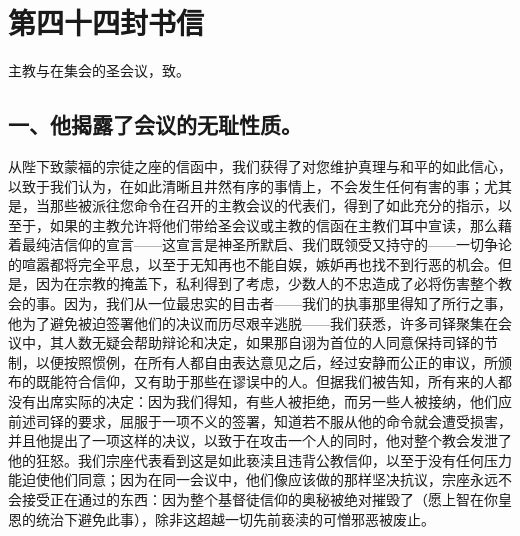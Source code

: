 

\section{第四十四封书信}

主教与在集会的圣会议，致。\par


\subsection{一、他揭露了会议的无耻性质。}

从陛下致蒙福的宗徒之座的信函中，我们获得了对您维护真理与和平的如此信心，以致于我们认为，在如此清晰且井然有序的事情上，不会发生任何有害的事；尤其是，当那些被派往您命令在召开的主教会议的代表们，得到了如此充分的指示，以至于，如果的主教允许将他们带给圣会议或主教的信函在主教们耳中宣读，那么藉着最纯洁信仰的宣言——这宣言是神圣所默启、我们既领受又持守的——一切争论的喧嚣都将完全平息，以至于无知再也不能自娱，嫉妒再也找不到行恶的机会。但是，因为在宗教的掩盖下，私利得到了考虑，少数人的不忠造成了必将伤害整个教会的事。因为，我们从一位最忠实的目击者——我们的执事那里得知了所行之事，他为了避免被迫签署他们的决议而历尽艰辛逃脱——我们获悉，许多司铎聚集在会议中，其人数无疑会帮助辩论和决定，如果那自诩为首位的人同意保持司铎的节制，以便按照惯例，在所有人都自由表达意见之后，经过安静而公正的审议，所颁布的既能符合信仰，又有助于那些在谬误中的人。但据我们被告知，所有来的人都没有出席实际的决定：因为我们得知，有些人被拒绝，而另一些人被接纳，他们应前述司铎的要求，屈服于一项不义的签署，知道若不服从他的命令就会遭受损害，并且他提出了一项这样的决议，以致于在攻击一个人的同时，他对整个教会发泄了他的狂怒。我们宗座代表看到这是如此亵渎且违背公教信仰，以至于没有任何压力能迫使他们同意；因为在同一会议中，他们像应该做的那样坚决抗议，宗座永远不会接受正在通过的东西：因为整个基督徒信仰的奥秘被绝对摧毁了（愿上智在你皇恩的统治下避免此事），除非这超越一切先前亵渎的可憎邪恶被废止。\par

